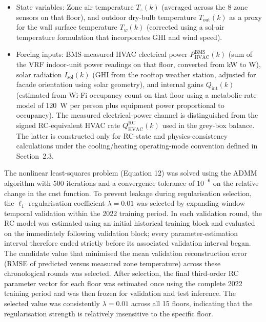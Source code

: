 \documentclass[11pt]{article}
\providecommand{\w}{\watt}
\begin{document}
\begin{itemize}[leftmargin=*]
\item State variables: Zone air temperature $T_z(k)$ (averaged across the 8 zone sensors on that floor), and outdoor dry-bulb temperature $T_{\text{out}}(k)$ as a proxy for the wall surface temperature $T_w(k)$ (corrected using a sol-air temperature formulation that incorporates GHI and wind speed).

\item Forcing inputs: BMS-measured HVAC electrical power $P_{\mathrm{HVAC}}^{\mathrm{BMS}}(k)$ (sum of the VRF indoor-unit power readings on that floor, converted from kW to W), solar radiation $I_{\mathrm{sol}}(k)$ (GHI from the rooftop weather station, adjusted for facade orientation using solar geometry), and internal gains $Q_{\mathrm{int}}(k)$ (estimated from Wi-Fi occupancy count on that floor using a metabolic-rate model of \SI{120}{\w} per person plus equipment power proportional to occupancy). The measured electrical-power channel is distinguished from the signed RC-equivalent HVAC rate $Q_{\mathrm{HVAC}}^{\mathrm{RC}}(k)$ used in the grey-box balance. The latter is constructed only for RC-state and physics-consistency calculations under the cooling/heating operating-mode convention defined in Section~2.3.
\end{itemize}

The nonlinear least-squares problem (Equation 12) was solved using the ADMM algorithm with 500 iterations and a convergence tolerance of $10^{-6}$ on the relative change in the cost function. To prevent leakage during regularisation selection, the $\ell_1$-regularisation coefficient $\lambda=0.01$ was selected by expanding-window temporal validation within the 2022 training period. In each validation round, the RC model was estimated using an initial historical training block and evaluated on the immediately following validation block; every parameter-estimation interval therefore ended strictly before its associated validation interval began. The candidate value that minimised the mean validation reconstruction error (RMSE of predicted versus measured zone temperature) across these chronological rounds was selected. After selection, the final third-order RC parameter vector for each floor was estimated once using the complete 2022 training period and was then frozen for validation and test inference. The selected value was consistently $\lambda=0.01$ across all 15 floors, indicating that the regularisation strength is relatively insensitive to the specific floor.
\end{document}
